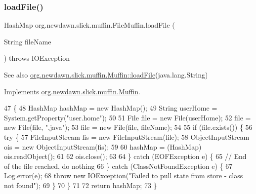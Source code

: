 \subsubsection{\texorpdfstring{load\+File()}{loadFile()}}
{\footnotesize\ttfamily Hash\+Map org.\+newdawn.\+slick.\+muffin.\+File\+Muffin.\+load\+File (\begin{DoxyParamCaption}\item[{String}]{file\+Name }\end{DoxyParamCaption}) throws I\+O\+Exception\hspace{0.3cm}{\ttfamily [inline]}}

\begin{DoxySeeAlso}{See also}
\mbox{\hyperlink{interfaceorg_1_1newdawn_1_1slick_1_1muffin_1_1_muffin_a2d6256b6d8f26b294f06341985047fbe}{org.\+newdawn.\+slick.\+muffin.\+Muffin\+::load\+File}}(java.\+lang.\+String) 
\end{DoxySeeAlso}


Implements \mbox{\hyperlink{interfaceorg_1_1newdawn_1_1slick_1_1muffin_1_1_muffin_a2d6256b6d8f26b294f06341985047fbe}{org.\+newdawn.\+slick.\+muffin.\+Muffin}}.


\begin{DoxyCode}
47                                                                 \{
48         HashMap hashMap = \textcolor{keyword}{new} HashMap();
49         String userHome = System.getProperty(\textcolor{stringliteral}{"user.home"});
50 
51         File file = \textcolor{keyword}{new} File(userHome);
52         file = \textcolor{keyword}{new} File(file, \textcolor{stringliteral}{".java"});
53         file = \textcolor{keyword}{new} File(file, fileName);
54 
55         \textcolor{keywordflow}{if} (file.exists()) \{
56             \textcolor{keywordflow}{try} \{
57                 FileInputStream fis = \textcolor{keyword}{new} FileInputStream(file);
58                 ObjectInputStream ois = \textcolor{keyword}{new} ObjectInputStream(fis);
59 
60                 hashMap = (HashMap) ois.readObject();
61 
62                 ois.close();
63 
64             \} \textcolor{keywordflow}{catch} (EOFException e) \{
65                 \textcolor{comment}{// End of the file reached, do nothing}
66             \} \textcolor{keywordflow}{catch} (ClassNotFoundException e) \{
67                 Log.error(e);
68                 \textcolor{keywordflow}{throw} \textcolor{keyword}{new} IOException(\textcolor{stringliteral}{"Failed to pull state from store - class not found"});
69             \}
70         \}
71 
72         \textcolor{keywordflow}{return} hashMap;
73     \}
\end{DoxyCode}
\mbox{\label{classorg_1_1newdawn_1_1slick_1_1muffin_1_1_file_muffin_ade293cc9f254442a763d22c2b0988aad}} 
